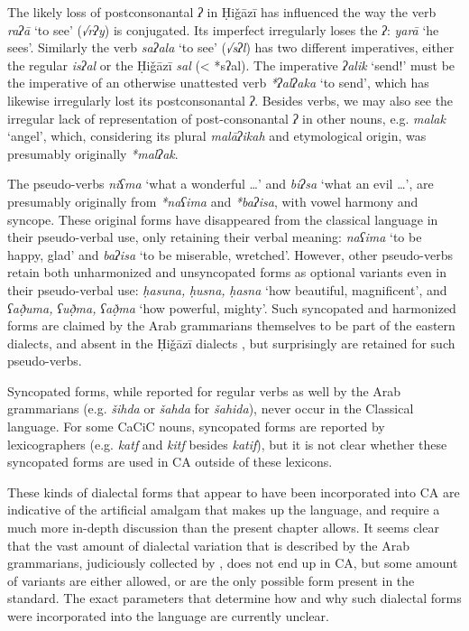 \documentclass[output=paper]{langsci/langscibook}
\begin{document}
The likely loss of postconsonantal \textit{ʔ} in Ḥiǧāzī  has influenced the way the verb \textit{raʔā} ‘to see’ (\textit{√rʔy}) is conjugated. Its imperfect irregularly loses the \textit{ʔ}: \textit{yarā} ‘he sees’. Similarly the verb \textit{saʔala} ‘to see’ (\textit{√sʔl}) has two different imperatives, either the regular \textit{isʔal} or the Ḥiǧāzī \textit{sal} (< *sʔal). The imperative \textit{ʔalik} ‘send!’ must be the imperative of an otherwise unattested verb \textit{*ʔalʔaka} ‘to send’, which has likewise irregularly lost its postconsonantal \textit{ʔ}. Besides verbs, we may also see the irregular lack of representation of post-consonantal \textit{ʔ} in other nouns, e.g. \textit{malak} ‘angel’, which, considering its plural \textit{malāʔikah} and etymological origin, was presumably originally \textit{*malʔak}.

The pseudo-verbs \textit{niʕma} ‘what a wonderful …’ and \textit{biʔsa} ‘what an evil …’, are presumably originally from \textit{*naʕima} and \textit{*baʔisa}, with vowel harmony and syncope. These original forms have disappeared from the classical language in their pseudo-verbal use, only retaining their verbal meaning: \textit{naʕima} ‘to be happy, glad’ and \textit{baʔisa} ‘to be miserable, wretched’. However, other pseudo-verbs retain both unharmonized and unsyncopated forms as optional variants even in their pseudo-verbal use: \textit{ḥasuna,} \textit{ḥusna,} \textit{ḥasna} ‘how beautiful, magnificent’, and \textit{ʕað̣uma,} \textit{ʕuð̣ma,} \textit{ʕað̣ma} ‘how powerful, mighty’. Such syncopated and harmonized forms are claimed by the Arab grammarians themselves to be part of the eastern dialects, and absent in the Ḥiǧāzī dialects \citep[97]{Rabin1951}, but surprisingly are retained for such pseudo-verbs.

Syncopated forms, while reported for regular verbs as well by the Arab grammarians (e.g. \textit{šihda} or \textit{šahda} for \textit{šahida}), never occur in the Classical language. For some CaCiC nouns, syncopated forms are reported by lexicographers (e.g. \textit{katf} and \textit{kitf} besides \textit{katif}), but it is not clear whether these syncopated forms are used in CA outside of these lexicons.

These kinds of dialectal forms that appear to have been incorporated into CA are indicative of the artificial amalgam that makes up the language, and require a much more in-depth discussion than the present chapter allows. It seems clear that the vast amount of dialectal variation that is described by the Arab grammarians, judiciously collected by \citet{Rabin1951}, does not end up in CA, but some amount of variants are either allowed, or are the only possible form present in the standard. The exact parameters that determine how and why such dialectal forms were incorporated into the language are currently unclear.
\end{document}
